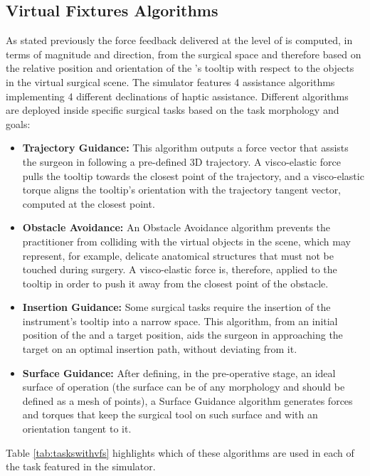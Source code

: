 \documentclass[../main.tex]{subfiles}
\begin{document}
\subsection{Virtual Fixtures Algorithms}
As stated previously the force feedback delivered at the level of \mtm is computed, in terms of magnitude and direction, from the surgical space and therefore based on the relative position and orientation of the \psm's tooltip with respect to the objects in the virtual surgical scene. The simulator features 4 assistance algorithms implementing 4 different declinations of haptic assistance. Different algorithms are deployed inside specific surgical tasks based on the task morphology and goals:
\begin{itemize}
  \item \textbf{Trajectory Guidance:} This algorithm outputs a force vector that assists the surgeon in following a pre-defined 3D trajectory. A visco-elastic force pulls the \ee tooltip towards the closest point of the trajectory, and a visco-elastic torque aligns the tooltip's orientation with the trajectory tangent vector, computed at the closest point.
  \item \textbf{Obstacle Avoidance:} An Obstacle Avoidance algorithm prevents the practitioner from colliding with the virtual objects in the scene, which may represent, for example, delicate anatomical structures that must not be touched during surgery. A visco-elastic force is, therefore, applied to the \ee tooltip in order to push it away from the closest point of the obstacle.
  \item \textbf{Insertion Guidance:} Some surgical tasks require the insertion of the instrument's tooltip into a narrow space. This algorithm, from an initial position of the \psm and a target position, aids the surgeon in approaching the target on an optimal insertion path, without deviating from it.
  \item \textbf{Surface Guidance:} After defining, in the pre-operative stage, an ideal surface of operation (the surface can be of any morphology and should be defined as a mesh of points), a Surface Guidance algorithm generates forces and torques that keep the surgical tool on such surface and with an orientation tangent to it. 
\end{itemize} 
Table \ref{tab:taskswithvfs} highlights which of these \vf algorithms are used in each of the task featured in the simulator.
\end{document}
